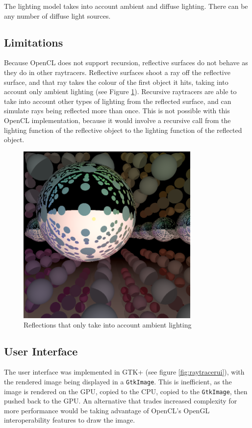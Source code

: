 \documentclass{article}
\begin{document}
The lighting model takes into account ambient and diffuse lighting. There can be any number of diffuse light sources.

\subsection{Limitations}
Because OpenCL does not support recursion, reflective surfaces do not behave as they do in other raytracers. Reflective surfaces shoot a ray off the reflective surface, and that ray takes the colour of the first object it hits, taking into account only ambient lighting (see Figure \ref{fig:reflections}). Recursive raytracers are able to take into account other types of lighting from the reflected surface, and can simulate rays being reflected more than once. This is not possible with this OpenCL implementation, because it would involve a recursive call from the lighting function of the reflective object to the lighting function of the reflected object.

\begin{figure}[ht!]
\centering
\includegraphics[width=90mm]{reflections.png}
\caption{Reflections that only take into account ambient lighting}
\label{fig:reflections}
\end{figure}

\subsection{User Interface}
The user interface was implemented in GTK+ (see figure \ref{fig:raytracerui}), with the rendered image being displayed in a \texttt{GtkImage}. This is inefficient, as the image is rendered on the GPU, copied to the CPU, copied to the \texttt{GtkImage}, then pushed back to the GPU. An alternative that trades increased complexity for more performance would be taking advantage of OpenCL's OpenGL interoperability features to draw the image.
\end{document}
